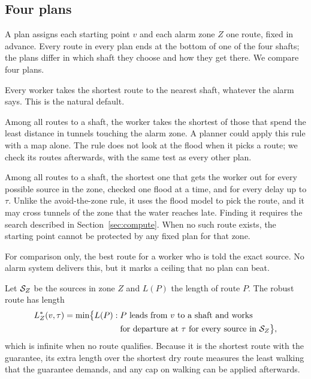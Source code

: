 \subsection{Four plans}
A plan assigns each starting point $v$ and each alarm zone $Z$ one route, fixed in advance. Every route in every plan ends at the bottom of one of the four shafts; the plans differ in which shaft they choose and how they get there. We compare four plans.
\begin{description}[leftmargin=1.2em,itemsep=3pt]
\item[Shortest route.] Every worker takes the shortest route to the nearest shaft, whatever the alarm says. This is the natural default.
\item[Avoid-the-zone rule.] Among all routes to a shaft, the worker takes the shortest of those that spend the least distance in tunnels touching the alarm zone. A planner could apply this rule with a map alone. The rule does not look at the flood when it picks a route; we check its routes afterwards, with the same test as every other plan.
\item[Robust route.] Among all routes to a shaft, the shortest one that gets the worker out for every possible source in the zone, checked one flood at a time, and for every delay up to $\tau$. Unlike the avoid-the-zone rule, it uses the flood model to pick the route, and it may cross tunnels of the zone that the water reaches late. Finding it requires the search described in Section~\ref{sec:compute}. When no such route exists, the starting point cannot be protected by any fixed plan for that zone.
\item[Exact source.] For comparison only, the best route for a worker who is told the exact source. No alarm system delivers this, but it marks a ceiling that no plan can beat.
\end{description}
Let $\mathcal{S}_Z$ be the sources in zone $Z$ and $L(P)$ the length of route $P$. The robust route has length
\begin{equation}
\begin{split}
 L_Z^*(v,\tau)=\min\bigl\{L(P):{}&P\text{ leads from }v\text{ to a shaft and works}\\
 &\text{for departure at }\tau\text{ for every source in }\mathcal{S}_Z\bigr\},
\end{split}
 \label{eq:main}
\end{equation}
which is infinite when no route qualifies. Because it is the shortest route with the guarantee, its extra length over the shortest dry route measures the least walking that the guarantee demands, and any cap on walking can be applied afterwards.

